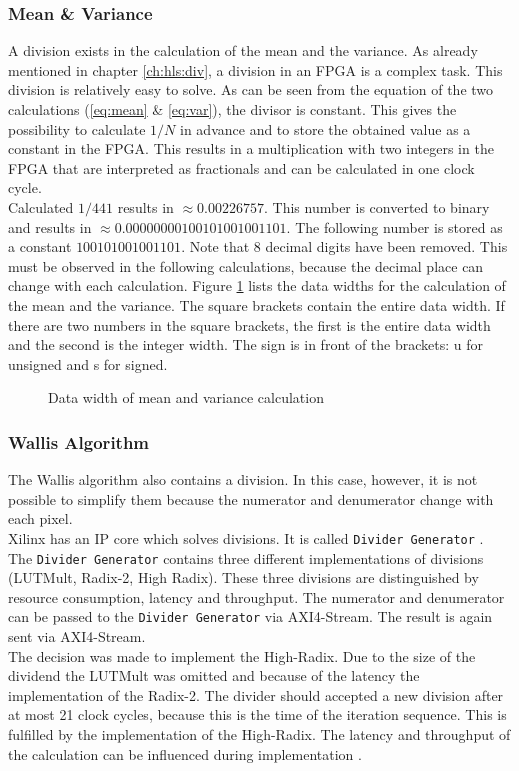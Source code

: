 \subsubsection*{Mean \& Variance}
A division exists in the calculation of the mean and the variance. As already mentioned in chapter \ref{ch:hls:div}, a division in an FPGA is a complex task.
This division is relatively easy to solve. As can be seen from the equation of
the two calculations (\ref{eq:mean} \& \ref{eq:var}), the divisor is constant.
This gives the possibility to calculate $1/N$ in advance and to store the
obtained value as a constant in the FPGA. This results in a multiplication with
two integers in the FPGA that are interpreted as fractionals and can be
calculated in one clock cycle. \\
Calculated $1/441$ results in $\approx 0.00226757$. This number is converted to
binary and results in $\approx 0.00000000100101001001101$. The following number
is stored as a constant $100101001001101$. Note that 8 decimal digits have been
removed. This must be observed in the following calculations, because the
decimal place can change with each calculation. Figure \ref{fig:data_mean_var}
lists the data widths for the calculation of the mean and the variance. The
square brackets contain the entire data width. If there are two numbers in the
square brackets, the first is the entire data width and the second is the
integer width. The sign is in front of the brackets: u for unsigned and s for
signed.

\begin{figure}[tb!]
    \centering
    \begin{adjustbox}{max width=\textwidth, keepaspectratio}
        
    \end{adjustbox}
    \caption{Data width of mean and variance calculation}
    \label{fig:data_mean_var}
\end{figure}

\subsubsection*{Wallis Algorithm}
The Wallis algorithm also contains a division. In this case, however, it is not
possible to simplify them
because the numerator and denumerator change with each pixel. \\
Xilinx has an IP core which solves divisions. It is called \texttt{Divider Generator} \cite{divider}. The \texttt{Divider Generator} contains three different implementations of divisions (LUTMult, Radix-2, High Radix). These three divisions are distinguished by resource consumption, latency and throughput. The numerator and denumerator can be passed to the \texttt{Divider Generator} via AXI4-Stream. The result is again sent via AXI4-Stream. \\
The decision was made to implement the High-Radix. Due to the size of the dividend the LUTMult was omitted and because of the latency the implementation of the Radix-2. The divider should accepted a new division after at most 21 clock cycles, because this is the time of the iteration sequence. This is fulfilled by the implementation of the High-Radix. The latency and throughput of the calculation can be influenced during implementation \cite{divider}.
